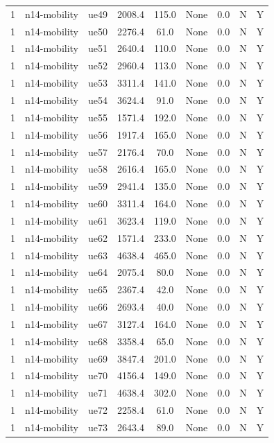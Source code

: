 \begin{table}[ht]
\begin{tabular}{|c|c|c|c|c|c|c|c|c|}
1 & n14-mobility & ue49 & 2008.4 & 115.0 & None & 0.0 & N & Y \\
1 & n14-mobility & ue50 & 2276.4 & 61.0 & None & 0.0 & N & Y \\
1 & n14-mobility & ue51 & 2640.4 & 110.0 & None & 0.0 & N & Y \\
1 & n14-mobility & ue52 & 2960.4 & 113.0 & None & 0.0 & N & Y \\
1 & n14-mobility & ue53 & 3311.4 & 141.0 & None & 0.0 & N & Y \\
1 & n14-mobility & ue54 & 3624.4 & 91.0 & None & 0.0 & N & Y \\
1 & n14-mobility & ue55 & 1571.4 & 192.0 & None & 0.0 & N & Y \\
1 & n14-mobility & ue56 & 1917.4 & 165.0 & None & 0.0 & N & Y \\
1 & n14-mobility & ue57 & 2176.4 & 70.0 & None & 0.0 & N & Y \\
1 & n14-mobility & ue58 & 2616.4 & 165.0 & None & 0.0 & N & Y \\
1 & n14-mobility & ue59 & 2941.4 & 135.0 & None & 0.0 & N & Y \\
1 & n14-mobility & ue60 & 3311.4 & 164.0 & None & 0.0 & N & Y \\
1 & n14-mobility & ue61 & 3623.4 & 119.0 & None & 0.0 & N & Y \\
1 & n14-mobility & ue62 & 1571.4 & 233.0 & None & 0.0 & N & Y \\
1 & n14-mobility & ue63 & 4638.4 & 465.0 & None & 0.0 & N & Y \\
1 & n14-mobility & ue64 & 2075.4 & 80.0 & None & 0.0 & N & Y \\
1 & n14-mobility & ue65 & 2367.4 & 42.0 & None & 0.0 & N & Y \\
1 & n14-mobility & ue66 & 2693.4 & 40.0 & None & 0.0 & N & Y \\
1 & n14-mobility & ue67 & 3127.4 & 164.0 & None & 0.0 & N & Y \\
1 & n14-mobility & ue68 & 3358.4 & 65.0 & None & 0.0 & N & Y \\
1 & n14-mobility & ue69 & 3847.4 & 201.0 & None & 0.0 & N & Y \\
1 & n14-mobility & ue70 & 4156.4 & 149.0 & None & 0.0 & N & Y \\
1 & n14-mobility & ue71 & 4638.4 & 302.0 & None & 0.0 & N & Y \\
1 & n14-mobility & ue72 & 2258.4 & 61.0 & None & 0.0 & N & Y \\
1 & n14-mobility & ue73 & 2643.4 & 89.0 & None & 0.0 & N & Y \\

\end{tabular}
\end{table}
